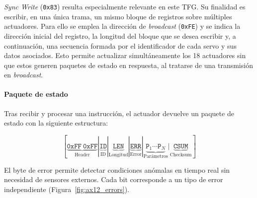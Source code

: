 \vspace{-0.5\baselineskip}

\textit{Sync Write} (\texttt{0x83}) resulta especialmente relevante en este
TFG. Su finalidad es escribir, en una única trama, un mismo bloque de
registros sobre múltiples actuadores. Para ello se emplea la dirección de
\textit{broadcast} (\texttt{0xFE}) y se indica la dirección inicial del
registro, la longitud del bloque que se desea escribir y, a continuación, una
secuencia formada por el identificador de cada servo y sus datos asociados.
Esto permite actualizar simultáneamente los 18 actuadores sin que estos generen
paquetes de estado en respuesta, al tratarse de una transmisión en
\textit{broadcast}.

\paragraph{Paquete de estado}

Tras recibir y procesar una instrucción, el actuador devuelve un paquete de estado con 
la siguiente estructura:

\begin{equation}
\label{eq:dynamixel_status}
[\underbrace{\texttt{0xFF}\ \texttt{0xFF}}_{\text{Header}} |
\underbrace{\texttt{ID}}_{\text{ID}} |
\underbrace{\texttt{LEN}}_{\text{Longitud}} |
\underbrace{\texttt{ERR}}_{\text{Error}} |
\underbrace{\texttt{P}_1 \cdots \texttt{P}_N}_{\text{Parámetros}} |
\underbrace{\texttt{CSUM}}_{\text{Checksum}}]
\end{equation}

El byte de error permite detectar condiciones anómalas en tiempo real sin necesidad de sensores externos. Cada bit corresponde a un tipo de error independiente (Figura~\ref{fig:ax12_errors}).

